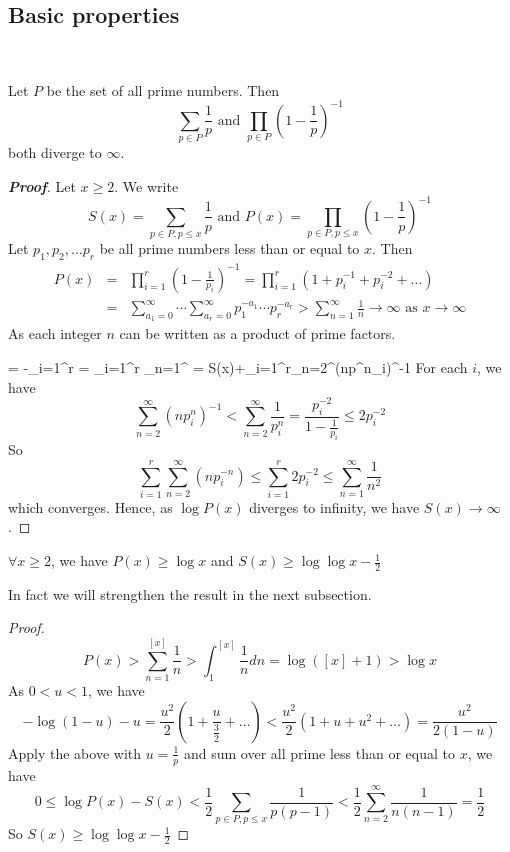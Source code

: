 \subsection{Basic properties}\
\begin{theorem} Let $P$ be the set of all prime numbers. Then
$$\sum_{p \in P} \frac{1}{p} \text{ and } \prod_{p \in P}\left(1-\frac{1}{p}\right)^{-1}$$
both diverge to $\infty$.
\end{theorem}
\begin{proof}[\bf Proof] Let $x \ge 2$. We write
$$S(x)=\sum_{p \in P,p \le x }\frac{1}{p} \text{ and }
P(x)=\prod_{p \in P,p \le x} \left(1-\frac{1}{p}\right)^{-1}$$
Let $p_1,p_2,\ldots p_r$ be all prime numbers less than or equal to $x$. Then
\begin{eqnarray*}
P(x)&=&\prod_{i=1}^{r}\left(1-\frac{1}{p_i}\right)^{-1} = \prod_{i=1}^{r}\left(1+p^{-1}_i+p^{-2}_i+\ldots \right)\\
&=&\sum_{a_1=0}^{\infty} \cdots \sum_{a_r=0}^{\infty}p^{-a_1}_1 \cdots p^{-a_r}_r >  \sum_{n=1}^{\infty}\frac{1}{n} \to{\infty} \text{ as } x \to{\infty}
\end{eqnarray*}
As each integer $n$ can be written as a product of prime factors.

\be
{} = -\sum_{i=1}^{r} = \sum_{i=1}^{r} \sum_{n=1}^{\infty}  = S(x)+\sum_{i=1}^{r}\sum_{n=2}^{\infty}\left(np^n_i\right)^{-1}
\ee
For each $i$, we have
$$\sum_{n=2}^{\infty}\left(np^n_i\right)^{-1} < \sum_{n=2}^{\infty}\frac{1}{p^n_i}
=\frac{p^{-2}_i}{1-\frac{1}{p_i}} \le 2p^{-2}_i$$
So
$$\sum_{i=1}^r \sum_{n=2}^{\infty}\left(np^{-n}_i\right) \le \sum_{i=1}^r 2p^{-2}_i
\le \sum_{n=1}^{\infty} \frac{1}{n^2}$$ which converges. Hence,
as $\log{P(x)}$ diverges to infinity, we have $S(x) \to \infty$.
\end{proof}

\begin{theorem} $\forall x \ge 2$, we have $P(x) \ge \log{x}$ and $S(x) \ge \log{\log{x}}-\frac{1}{2}$
\end{theorem}
In fact we will strengthen the result in the next subsection.
\begin{proof}
$$P(x) > \sum_{n=1}^{[x]}\frac{1}{n} >\int_1^{[x]}\frac{1}{n}dn=\log{([x]+1)} >\log{x}$$
As $0<u<1$, we have
$$-\log{(1-u)}-u=\frac{u^2}{2}\left(1+\frac{u}{\frac{3}{2}}+\ldots\right)
<\frac{u^2}{2}\left(1+u+u^2+\ldots\right)=\frac{u^2}{2(1-u)}$$
Apply the above with $u=\frac{1}{p}$ and sum over all prime less than or equal to $x$, we have
$$0 \le \log{P(x)}-S(x)<\frac{1}{2}\sum_{p \in P,p \le x}\frac{1}{p(p-1)}<\frac{1}{2}\sum_{n=2}^{\infty}\frac{1}{n(n-1)}=\frac{1}{2}$$
So $S(x) \ge \log{\log{x}}-\frac{1}{2}$
\end{proof}

